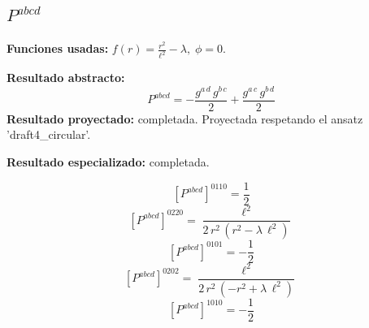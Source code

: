 \documentclass[11pt]{article}
\begin{document}
\subsection*{$ P^{abcd} $}
\textbf{Funciones usadas:} $ f\!\left(r\right) = \frac{{r}^{2}}{{\ell}^{2}} - \lambda,\;\phi=0 $.\par
\textbf{Resultado abstracto:}
\begin{dmath*}[breakdepth={5}]
P^{abcd} = -\frac{g{}^{a\,d}\,g{}^{b\,c}}{2} + \frac{g{}^{a\,c}\,g{}^{b\,d}}{2}
\end{dmath*}
\textbf{Resultado proyectado:} completada. Proyectada respetando el ansatz 'draft4\_circular'.\par
\textbf{Resultado especializado:} completada.\par
\begin{dmath*}[breakdepth={5}]
\left[P^{abcd}\right]^{0110} = \frac{1}{2}
\end{dmath*}
\begin{dmath*}[breakdepth={5}]
\left[P^{abcd}\right]^{0220} = \frac{{\ell}^{2}}{2\,{r}^{2}\,\left({r}^{2} - \lambda\,{\ell}^{2}\right)}
\end{dmath*}
\begin{dmath*}[breakdepth={5}]
\left[P^{abcd}\right]^{0101} = -\frac{1}{2}
\end{dmath*}
\begin{dmath*}[breakdepth={5}]
\left[P^{abcd}\right]^{0202} = \frac{{\ell}^{2}}{2\,{r}^{2}\,\left(-{r}^{2} + \lambda\,{\ell}^{2}\right)}
\end{dmath*}
\begin{dmath*}[breakdepth={5}]
\left[P^{abcd}\right]^{1010} = -\frac{1}{2}
\end{dmath*}
\end{document}
